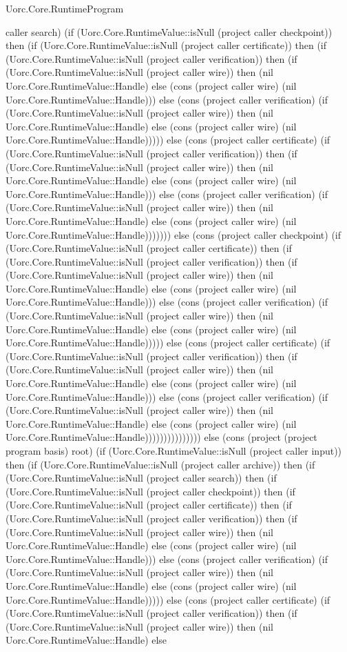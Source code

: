 \begin{lexlean}{Uorc.Core.RuntimeProgram}
\begin{semanticmodule}
{caller search) (if (Uorc.Core.RuntimeValue::isNull (project caller checkpoint)) then (if (Uorc.Core.RuntimeValue::isNull (project caller certificate)) then (if (Uorc.Core.RuntimeValue::isNull (project caller verification)) then (if (Uorc.Core.RuntimeValue::isNull (project caller wire)) then (nil Uorc.Core.RuntimeValue::Handle) else (cons (project caller wire) (nil Uorc.Core.RuntimeValue::Handle))) else (cons (project caller verification) (if (Uorc.Core.RuntimeValue::isNull (project caller wire)) then (nil Uorc.Core.RuntimeValue::Handle) else (cons (project caller wire) (nil Uorc.Core.RuntimeValue::Handle))))) else (cons (project caller certificate) (if (Uorc.Core.RuntimeValue::isNull (project caller verification)) then (if (Uorc.Core.RuntimeValue::isNull (project caller wire)) then (nil Uorc.Core.RuntimeValue::Handle) else (cons (project caller wire) (nil Uorc.Core.RuntimeValue::Handle))) else (cons (project caller verification) (if (Uorc.Core.RuntimeValue::isNull (project caller wire)) then (nil Uorc.Core.RuntimeValue::Handle) else (cons (project caller wire) (nil Uorc.Core.RuntimeValue::Handle))))))) else (cons (project caller checkpoint) (if (Uorc.Core.RuntimeValue::isNull (project caller certificate)) then (if (Uorc.Core.RuntimeValue::isNull (project caller verification)) then (if (Uorc.Core.RuntimeValue::isNull (project caller wire)) then (nil Uorc.Core.RuntimeValue::Handle) else (cons (project caller wire) (nil Uorc.Core.RuntimeValue::Handle))) else (cons (project caller verification) (if (Uorc.Core.RuntimeValue::isNull (project caller wire)) then (nil Uorc.Core.RuntimeValue::Handle) else (cons (project caller wire) (nil Uorc.Core.RuntimeValue::Handle))))) else (cons (project caller certificate) (if (Uorc.Core.RuntimeValue::isNull (project caller verification)) then (if (Uorc.Core.RuntimeValue::isNull (project caller wire)) then (nil Uorc.Core.RuntimeValue::Handle) else (cons (project caller wire) (nil Uorc.Core.RuntimeValue::Handle))) else (cons (project caller verification) (if (Uorc.Core.RuntimeValue::isNull (project caller wire)) then (nil Uorc.Core.RuntimeValue::Handle) else (cons (project caller wire) (nil Uorc.Core.RuntimeValue::Handle))))))))))))))) else (cons (project (project program basis) root) (if (Uorc.Core.RuntimeValue::isNull (project caller input)) then (if (Uorc.Core.RuntimeValue::isNull (project caller archive)) then (if (Uorc.Core.RuntimeValue::isNull (project caller search)) then (if (Uorc.Core.RuntimeValue::isNull (project caller checkpoint)) then (if (Uorc.Core.RuntimeValue::isNull (project caller certificate)) then (if (Uorc.Core.RuntimeValue::isNull (project caller verification)) then (if (Uorc.Core.RuntimeValue::isNull (project caller wire)) then (nil Uorc.Core.RuntimeValue::Handle) else (cons (project caller wire) (nil Uorc.Core.RuntimeValue::Handle))) else (cons (project caller verification) (if (Uorc.Core.RuntimeValue::isNull (project caller wire)) then (nil Uorc.Core.RuntimeValue::Handle) else (cons (project caller wire) (nil Uorc.Core.RuntimeValue::Handle))))) else (cons (project caller certificate) (if (Uorc.Core.RuntimeValue::isNull (project caller verification)) then (if (Uorc.Core.RuntimeValue::isNull (project caller wire)) then (nil Uorc.Core.RuntimeValue::Handle) else }
\end{semanticmodule}
\end{lexlean}
